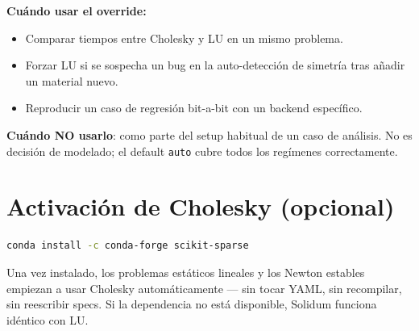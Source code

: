 \documentclass[11pt,letterpaper,oneside]{report}
\begin{document}
\textbf{Cuándo usar el override:}

\begin{itemize}
  \item Comparar tiempos entre Cholesky y LU en un mismo problema.
  \item Forzar LU si se sospecha un bug en la auto-detección de simetría tras añadir un material nuevo.
  \item Reproducir un caso de regresión bit-a-bit con un backend específico.
\end{itemize}

\textbf{Cuándo NO usarlo}: como parte del setup habitual de un caso de análisis. No es decisión de modelado; el default \texttt{auto} cubre todos los regímenes correctamente.

\section{Activación de Cholesky (opcional)}

\begin{lstlisting}[language=bash]
conda install -c conda-forge scikit-sparse

\end{lstlisting}

Una vez instalado, los problemas estáticos lineales y los Newton estables empiezan a usar Cholesky automáticamente --- sin tocar YAML, sin recompilar, sin reescribir specs. Si la dependencia no está disponible, Solidum funciona idéntico con LU.


\newpage
\end{document}
